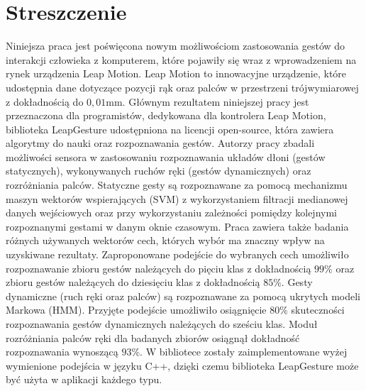 \chapter{Streszczenie}
Niniejsza praca jest poświęcona nowym możliwościom zastosowania gestów do interakcji człowieka z komputerem, które pojawiły się wraz z wprowadzeniem na rynek urządzenia Leap Motion.
Leap Motion to innowacyjne urządzenie, które udostępnia dane dotyczące pozycji rąk oraz palców w przestrzeni trójwymiarowej z dokładnością do $0,01$mm.
Głównym rezultatem niniejszej pracy jest przeznaczona dla programistów, dedykowana dla kontrolera Leap Motion, biblioteka LeapGesture udostępniona na licencji open-source, która zawiera algorytmy do nauki oraz rozpoznawania gestów.
Autorzy pracy zbadali możliwości sensora w zastosowaniu rozpoznawania układów dłoni (gestów statycznych), wykonywanych ruchów ręki (gestów dynamicznych) oraz rozróżniania palców.
Statyczne gesty są rozpoznawane za pomocą mechanizmu maszyn wektorów wspierających (SVM) z wykorzystaniem filtracji medianowej danych wejściowych oraz przy wykorzystaniu zależności pomiędzy kolejnymi rozpoznanymi gestami w danym oknie czasowym.
Praca zawiera także badania różnych używanych wektorów cech, których wybór ma znaczny wpływ na uzyskiwane rezultaty.
Zaproponowane podejście do wybranych cech umożliwiło rozpoznawanie zbioru gestów należących do pięciu klas z dokładnością $99\%$ oraz zbioru gestów należących do dziesięciu klas z dokładnością $85\%$.
Gesty dynamiczne (ruch ręki oraz palców) są rozpoznawane za pomocą ukrytych modeli Markowa (HMM).
Przyjęte podejście umożliwiło osiągnięcie $80\%$ skuteczności rozpoznawania gestów dynamicznych należących do sześciu klas.
Moduł rozróżniania palców ręki dla badanych zbiorów osiągnął dokładność rozpoznawania wynoszącą $93\%$. 
W bibliotece zostały zaimplementowane wyżej wymienione podejścia w języku C++, dzięki czemu biblioteka LeapGesture może być użyta w aplikacji każdego typu.

